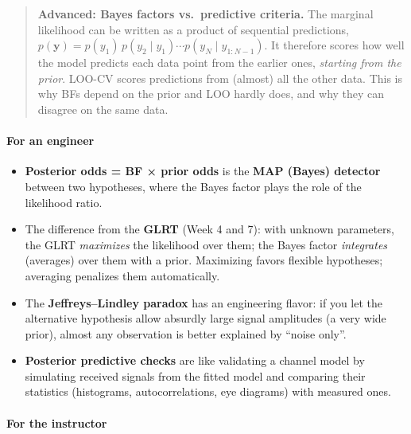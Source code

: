\begin{quote}
\textbf{Advanced: Bayes factors vs.~predictive criteria.} The marginal
likelihood can be written as a product of sequential predictions,
\(p(\mathbf{y}) = p(y_1)\,p(y_2\mid y_1)\cdots p(y_N\mid y_{1:N-1})\).
It therefore scores how well the model predicts each data point from the
earlier ones, \emph{starting from the prior}. LOO-CV scores predictions
from (almost) all the other data. This is why BFs depend on the prior
and LOO hardly does, and why they can disagree on the same data.
\end{quote}

\paragraph{For an engineer}

\begin{itemize}
\tightlist
\item
  \textbf{Posterior odds = BF × prior odds} is the \textbf{MAP (Bayes)
  detector} between two hypotheses, where the Bayes factor plays the
  role of the likelihood ratio.
\item
  The difference from the \textbf{GLRT} (Week 4 and 7): with unknown
  parameters, the GLRT \emph{maximizes} the likelihood over them; the
  Bayes factor \emph{integrates} (averages) over them with a prior.
  Maximizing favors flexible hypotheses; averaging penalizes them
  automatically.
\item
  The \textbf{Jeffreys--Lindley paradox} has an engineering flavor: if
  you let the alternative hypothesis allow absurdly large signal
  amplitudes (a very wide prior), almost any observation is better
  explained by ``noise only''.
\item
  \textbf{Posterior predictive checks} are like validating a channel
  model by simulating received signals from the fitted model and
  comparing their statistics (histograms, autocorrelations, eye
  diagrams) with measured ones.
\end{itemize}

\paragraph{For the instructor}

